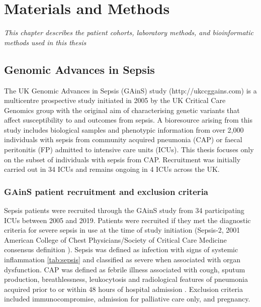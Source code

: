 \chapter{Materials and Methods}
\label{ch:MandM}
\textit{This chapter describes the patient cohorts, laboratory methods, and bioinformatic methods used in this thesis}

\startcontents[chapters]{\vspace{-1.4cm}}
\singlespacing
{}
\doublespacing

\section{Genomic Advances in Sepsis}
The UK Genomic Advances in Sepsis (GAinS) study (http://ukccggains.com) is a multicentre prospective study initiated in 2005 by the UK Critical Care Genomics group with the original aim of characterising genetic variants that affect susceptibility to and outcomes from sepsis. A bioresource arising from this study includes biological samples and phenotypic information from over 2,000 individuals with sepsis from community acquired pneumonia (CAP) or faecal peritonitis (FP) admitted to intensive care units (ICUs). This thesis focuses only on the subset of individuals with sepsis from CAP. Recruitment was initially carried out in 34 ICUs and remains ongoing in 4 ICUs across the UK.

\subsection{GAinS patient recruitment and exclusion criteria}
Sepsis patients were recruited through the GAinS study from 34 participating ICUs between 2005 and 2019. Patients were recruited if they met the diagnostic criteria for severe sepsis in use at the time of study initiation (Sepsis-2, 2001 American College of Chest Physicians/Society of Critical Care Medicine consensus definition \parencite{Levy2003}).  Sepsis was defined as infection with signs of systemic inflammation \ref{tab:sepsis} and classified as severe when associated with organ dysfunction. CAP was defined as febrile illness associated with cough, sputum production, breathlessness, leukocytosis and radiological features of pneumonia acquired prior to or within 48 hours of hospital admission \parencite{Lim2009}. Exclusion criteria included immunocompromise, admission for palliative care only, and pregnancy.

